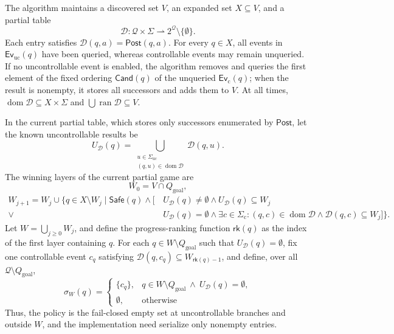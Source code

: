 \documentclass[acmsmall,screen,review,anonymous]{acmart}
\newcommand{\Post}{\mathsf{Post}}
\newcommand{\Safe}{\mathsf{Safe}}
\newcommand{\Goal}{Q_{\mathrm{goal}}}
\newcommand{\rank}{\mathsf{rk}}
\newcommand{\Ev}{\mathsf{Ev}}
\newcommand{\Cand}{\mathsf{Cand}}
\newcommand{\Sigmauc}{\Sigma_{\mathrm{uc}}}
\newcommand{\Sigmac}{\Sigma_{\mathrm{c}}}
\begin{document}
The algorithm maintains a discovered set $V$, an expanded set $X\subseteq V$, and a partial table
\[
 \mathcal D:\mathcal Q\times\Sigma
 \rightharpoonup 2^{\mathcal Q}\setminus\{\emptyset\}.
\tag{9}
\]
Each entry satisfies $\mathcal D(q,a)=\Post(q,a)$. For every $q\in X$, all events in $\Ev_{\mathrm{uc}}(q)$ have been queried, whereas controllable events may remain unqueried.
If no uncontrollable event is enabled, the algorithm removes and queries the first element of the fixed ordering $\Cand(q)$ of the unqueried $\Ev_{\mathrm{c}}(q)$; when the result is nonempty, it stores all successors and adds them to $V$. At all times,
$\operatorname{dom}\mathcal D\subseteq X\times\Sigma$ and
$\bigcup\operatorname{ran}\mathcal D\subseteq V$.

In the current partial table, which stores only successors enumerated by $\Post$, let the known uncontrollable results be
\[
 U_{\mathcal D}(q)=
 \bigcup_{\substack{u\in\Sigmauc\\(q,u)\in\operatorname{dom}\mathcal D}}
 \mathcal D(q,u).
\]
The winning layers of the current partial game are
\[
 W_0=V\cap\Goal,
\tag{10}\label{eq:winning-base}
\]
\[
\begin{aligned}
W_{j+1}=W_j\cup\{q\in X\setminus W_j\mid
\Safe(q)\land[
&\,U_{\mathcal D}(q)\neq\emptyset
   \land U_{\mathcal D}(q)\subseteq W_j\\
{}\lor{}&
\,U_{\mathcal D}(q)=\emptyset
   \land\exists c\in\Sigmac:
   (q,c)\in\operatorname{dom}\mathcal D
   \land\mathcal D(q,c)\subseteq W_j]\}.
\end{aligned}
\tag{11}\label{eq:winning-step}
\]
Let $W=\bigcup_{j\geq0}W_j$, and define the progress-ranking function $\rank(q)$ as the index of the first layer containing $q$.
For each $q\in W\setminus\Goal$ such that $U_{\mathcal D}(q)=\emptyset$, fix one controllable event $c_q$ satisfying
$\mathcal D(q,c_q)\subseteq W_{\rank(q)-1}$, and define, over all $\mathcal Q\setminus\Goal$,
\[
\sigma_W(q)=
\begin{cases}
\{c_q\},&q\in W\setminus\Goal\ \land\ U_{\mathcal D}(q)=\emptyset,\\
\emptyset,&\text{otherwise}
\end{cases}
\tag{12}\label{eq:sigma-construction}
\]
Thus, the policy is the fail-closed empty set at uncontrollable branches and outside $W$, and the implementation need serialize only nonempty entries.
\end{document}
